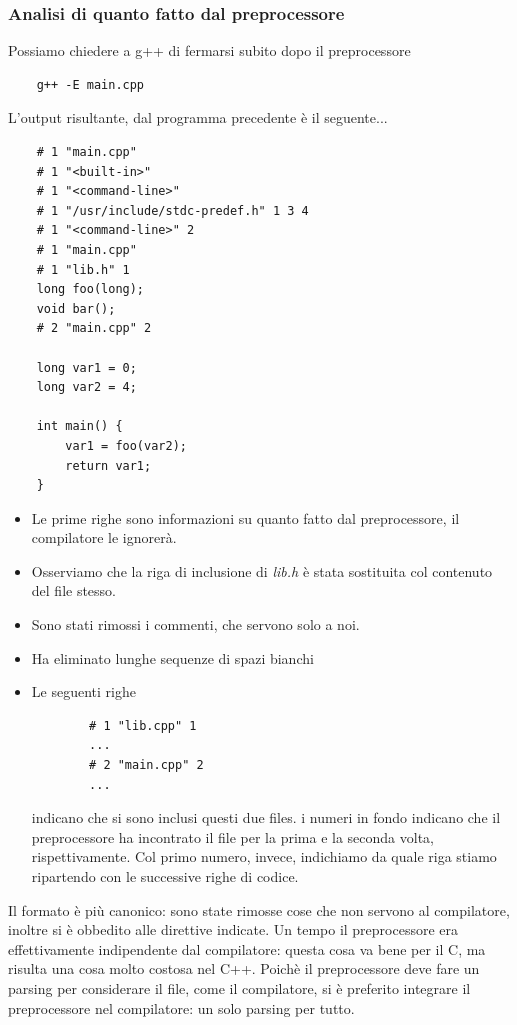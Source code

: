 \subsubsection{Analisi di quanto fatto dal preprocessore} Possiamo chiedere a g++ di fermarsi subito dopo il preprocessore
\begin{verbatim}
	g++ -E main.cpp
\end{verbatim}
L'output risultante, dal programma precedente è il seguente...
\begin{verbatim}
	# 1 "main.cpp"
	# 1 "<built-in>"
	# 1 "<command-line>"
	# 1 "/usr/include/stdc-predef.h" 1 3 4
	# 1 "<command-line>" 2
	# 1 "main.cpp"
	# 1 "lib.h" 1
	long foo(long);
	void bar();
	# 2 "main.cpp" 2
	
	long var1 = 0;
	long var2 = 4;
	
	int main() {
		var1 = foo(var2);
		return var1;
	}
\end{verbatim}
\begingroup
\begin{itemize}
	\item Le prime righe sono informazioni su quanto fatto dal preprocessore, il compilatore le ignorerà.
	\item Osserviamo che la riga di inclusione di \emph{lib.h} è stata sostituita col contenuto del file stesso. 
	\item Sono stati rimossi i commenti, che servono solo a noi.
	\item Ha eliminato lunghe sequenze di spazi bianchi
	\item Le seguenti righe
	\begin{verbatim}
		# 1 "lib.cpp" 1
		...
		# 2 "main.cpp" 2
		...
	\end{verbatim}
	indicano che si sono inclusi questi due files. i numeri in fondo indicano che il preprocessore ha incontrato il file per la prima e la seconda volta, rispettivamente. Col primo numero, invece, indichiamo da quale riga stiamo ripartendo con le successive righe di codice.
\end{itemize}
Il formato è più canonico: sono state rimosse cose che non servono al compilatore, inoltre si è obbedito alle direttive indicate. Un tempo il preprocessore era effettivamente indipendente dal compilatore: questa cosa va bene per il C, ma risulta una cosa molto costosa nel C++. Poichè il preprocessore deve fare un parsing per considerare il file, come il compilatore, si è preferito integrare il preprocessore nel compilatore: un solo parsing per tutto.
\endgroup
